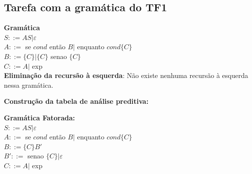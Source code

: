 \documentclass[ 12pt, a4paper]{article}
\begin{document}
		\subsection{Tarefa com a gramática do TF1}
			\textbf{Gramática}\\
			$S::= AS|\varepsilon$\\
			$A::=$ se $cond$ então $B |$ enquanto $cond \{C\}$\\
			$B::= \{C\} | \{C\} $ senao $\{C\}$\\			
			$C::= A |$ exp\\
			
			\textbf{Eliminação da recursão à esquerda}:
			Não existe nenhuma recursão à esquerda nessa gramática.
			
			\textbf{Construção da tabela de análise preditiva:}
			
\begin{landscape}
	
	\textbf{Gramática Fatorada:}\\
	$S::= AS|\varepsilon$\\
	$A::=$ se $cond$ então $B |$ enquanto $cond \{C\}$\\
	$B::= \{C\}B'$\\
	$B'::=$ senao $\{C\} | \varepsilon $\\			
	$C::= A |$ exp\\
\thispagestyle{empty}
\begin{table}[h]
\centering
{}
\end{table}
\end{landscape}
\end{document}
